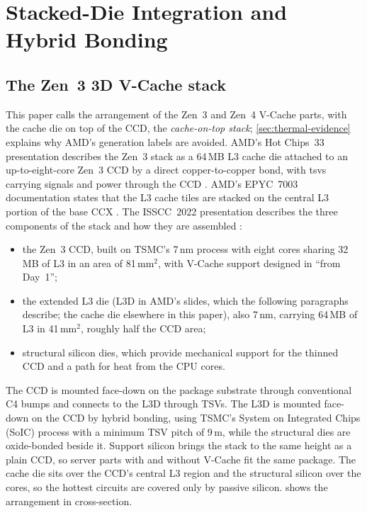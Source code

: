 \section{Stacked-Die Integration and Hybrid Bonding}
\label{sec:hybrid-bonding}

\subsection{The Zen~3 3D V-Cache stack}
This paper calls the arrangement of the Zen~3 and Zen~4 V-Cache parts, with the cache die on top of the CCD, the \emph{cache-on-top stack}; \cref{sec:thermal-evidence} explains why AMD's generation labels are avoided. AMD's Hot Chips~33 presentation describes the Zen~3 stack as a 64\,MB L3 cache die attached to an up-to-eight-core Zen~3 CCD by a direct copper-to-copper bond, with \glspl{tsv} carrying signals and power through the CCD \cite{swaminathanAdvancedPackagingEnabling2021}. AMD's EPYC~7003 documentation states that the L3 cache tiles are stacked on the central L3 portion of the base CCX \cite{amd2022epyc7003}. The ISSCC~2022 presentation describes the three components of the stack and how they are assembled \cite[slides~10--12, 14, 16--17]{wuu2022vcache}:
\begin{itemize}
  \item the Zen~3 CCD, built on TSMC's 7\,nm process with eight cores sharing 32\,MB of L3 in an area of 81\,mm$^2$, with V-Cache support designed in ``from Day~1'';
  \item the extended L3 die (L3D in AMD's slides, which the following paragraphs describe; the cache die elsewhere in this paper), also 7\,nm, carrying 64\,MB of L3 in 41\,mm$^2$, roughly half the CCD area;
  \item structural silicon dies, which provide mechanical support for the thinned CCD and a path for heat from the CPU cores.
\end{itemize}
The CCD is mounted face-down on the package substrate through conventional C4 bumps and connects to the L3D through TSVs. The L3D is mounted face-down on the CCD by hybrid bonding, using TSMC's System on Integrated Chips (SoIC) process with a minimum TSV pitch of 9\,\textmu m, while the structural dies are oxide-bonded beside it. Support silicon brings the stack to the same height as a plain CCD, so server parts with and without V-Cache fit the same package. The cache die sits over the CCD's central L3 region \cite{amd2022epyc7003} and the structural silicon over the cores, so the hottest circuits are covered only by passive silicon.  shows the arrangement in cross-section.

